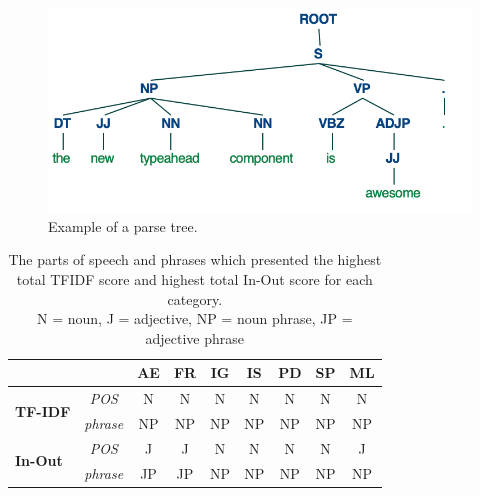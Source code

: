 \documentclass[letterpaper, 12 pt, conference]{ieeeconf}
\begin{document}
\begin{figure}
    \centering
    \includegraphics[scale=.68]{parse_tree.png}
    \caption{Example of a parse tree.}
    \label{fig:parse_tree}
\end{figure}
\begin{table}[tp]
    \centering
    \begin{tabular}{lcccccccc}
        \toprule
            & &
            \multicolumn{1}{c}{\textbf{AE}} & \multicolumn{1}{c}{\textbf{FR}} & \multicolumn{1}{c}{\textbf{IG}} & \multicolumn{1}{c}{\textbf{IS}} & \multicolumn{1}{c}{\textbf{PD}} & \multicolumn{1}{c}{\textbf{SP}} & \multicolumn{1}{c}{\textbf{ML}} \\
        \midrule
        \multirow{2}{*}{\textbf{TF-IDF}} & \textit{POS} & N & N & N & N & N & N & N \\
        & \textit{phrase} & NP & NP & NP & NP & NP & NP & NP \\
        \midrule
        \multirow{2}{*}{\textbf{In-Out}} & \textit{POS} & J & J & N & N & N & N & J \\
        & \textit{phrase} & JP & JP & NP & NP & NP & NP & NP \\
        \bottomrule
    \end{tabular}
    \caption{The parts of speech and phrases which presented the highest total TFIDF score and highest total In-Out score for each category.\\N = noun, J = adjective, NP = noun phrase, JP = adjective phrase}
    \label{table:most-important}
\end{table}
\end{document}
